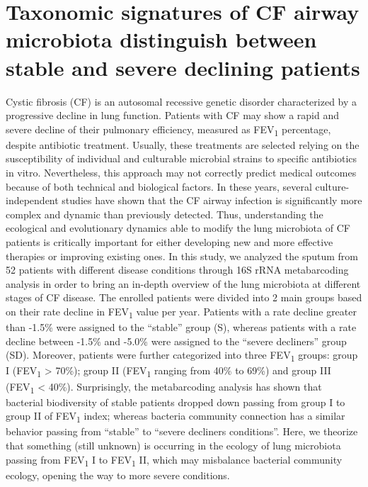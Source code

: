 \section{Taxonomic signatures of CF airway microbiota distinguish between stable and severe declining patients}
Cystic fibrosis (CF) is an autosomal recessive genetic disorder characterized by a progressive decline in lung function. Patients with CF may show a rapid and severe decline of their pulmonary efficiency, measured as FEV\textsubscript{1} percentage, despite antibiotic treatment. Usually, these treatments are selected relying on the susceptibility of individual and culturable microbial strains to specific antibiotics in vitro. Nevertheless, this approach may not correctly predict medical outcomes because of both technical and biological factors. In these years, several culture-independent studies have shown that the CF airway infection is significantly more complex and dynamic than previously detected. Thus, understanding the ecological and evolutionary dynamics able to modify the lung microbiota of CF patients is critically important for either developing new and more effective therapies or improving existing ones. In this study, we analyzed the sputum from 52 patients with different disease conditions through 16S rRNA metabarcoding analysis in order to bring an in-depth overview of the lung microbiota at different stages of CF disease. The enrolled patients were divided into 2 main groups based on their rate decline in FEV\textsubscript{1} value per year. Patients with a rate decline greater than -1.5\% were assigned to the ``stable'' group (S), whereas patients with a rate decline between -1.5\% and -5.0\% were assigned to the ``severe decliners'' group (SD). Moreover, patients were further categorized into three FEV\textsubscript{1} groups: group I (FEV\textsubscript{1} {\textgreater} 70\%); group II (FEV\textsubscript{1} ranging from 40\% to 69\%) and group III (FEV\textsubscript{1} {\textless} 40\%). Surprisingly, the metabarcoding analysis has shown that bacterial biodiversity of stable patients dropped down passing from group I to group II of FEV\textsubscript{1} index; whereas bacteria community connection has a similar behavior passing from ``stable'' to ``severe decliners conditions''. Here, we theorize that something (still unknown) is occurring in the ecology of lung microbiota passing from FEV\textsubscript{1} I to FEV\textsubscript{1} II, which may misbalance bacterial community ecology, opening the way to more severe conditions.\\

